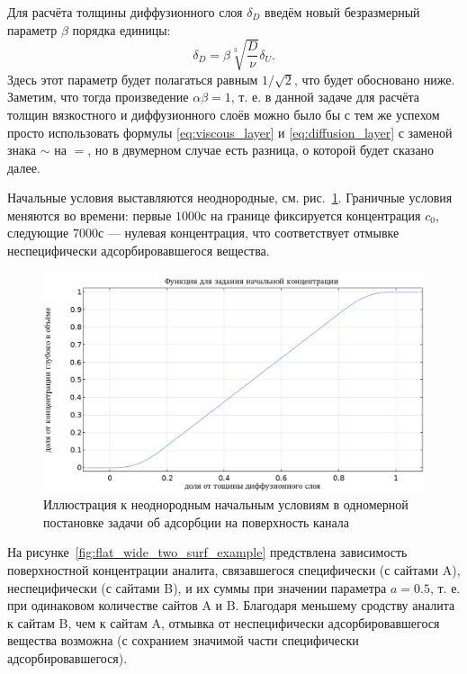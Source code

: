 \documentclass[oneside,final,12pt]{extreport}
\begin{document}
Для расчёта толщины диффузионного слоя $\delta_D$ введём новый безразмерный
параметр $\beta$ порядка единицы:
\begin{equation}
  \delta_D = \beta\sqrt[3]{\frac{D}{\nu}} \delta_U.
  \label{eq:diffusion_layer_beta}
\end{equation}
Здесь этот параметр будет полагаться равным $1/\sqrt{2}$, что будет обосновано ниже.
Заметим, что тогда произведение $\alpha\beta = 1$, т. е.
в данной задаче для расчёта толщин вязкостного и диффузионного слоёв
можно было бы с тем же успехом просто использовать формулы
\eqref{eq:viscous_layer} и \eqref{eq:diffusion_layer}
с заменой знака $\sim$ на $=$,
но в двумерном случае есть разница, о которой будет сказано далее.%

Начальные условия выставляются неоднородные,
см. рис.~\ref{fig:flat_wide_ramp_ic}.
Граничные условия меняются во времени: первые $1000\text{с}$
на границе фиксируется концентрация $c_0$,
следующие $7000\text{с}$ --- нулевая концентрация, что соответствует отмывке
неспецифически адсорбировавшегося вещества.

\begin{figure}
  \centering
  \includegraphics[width=.7\textwidth]{pic/wide_two_surf_ramp}
  
  \caption{%
    \label{fig:flat_wide_ramp_ic}%
    Иллюстрация к неоднородным начальным условиям в одномерной постановке
    задачи об адсорбции на поверхность канала
  }

\end{figure}

На рисунке~\ref{fig:flat_wide_two_surf_example} предствлена зависимость
поверхностной концентрации аналита, связавшегося специфически (с сайтами A),
неспецифически (с сайтами B), и их суммы при значении параметра $a = 0.5$,
т. е. при одинаковом количестве сайтов A и B.
Благодаря меньшему сродству аналита к сайтам B, чем к сайтам A, отмывка
от неспецифически адсорбировавшегося вещества возможна
(с сохранием значимой части специфически адсорбировавшегося).
\end{document}
